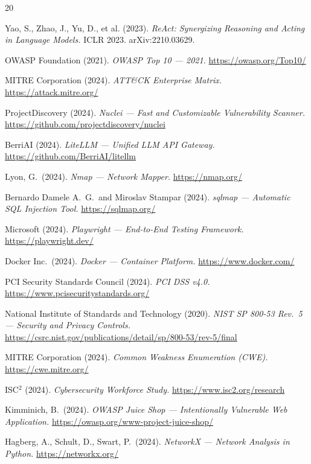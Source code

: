 \documentclass[12pt,a4paper,twoside]{report}
\begin{document}
\begin{thebibliography}{20}

Yao, S., Zhao, J., Yu, D., et al. (2023).
\textit{ReAct: Synergizing Reasoning and Acting in Language Models.}
ICLR 2023. arXiv:2210.03629.

OWASP Foundation (2021).
\textit{OWASP Top 10 --- 2021.}
\url{https://owasp.org/Top10/}

MITRE Corporation (2024).
\textit{ATT\&CK Enterprise Matrix.}
\url{https://attack.mitre.org/}

ProjectDiscovery (2024).
\textit{Nuclei --- Fast and Customizable Vulnerability Scanner.}
\url{https://github.com/projectdiscovery/nuclei}

BerriAI (2024).
\textit{LiteLLM --- Unified LLM API Gateway.}
\url{https://github.com/BerriAI/litellm}

Lyon, G.\ (2024).
\textit{Nmap --- Network Mapper.}
\url{https://nmap.org/}

Bernardo Damele A.\ G.\ and Miroslav Stampar (2024).
\textit{sqlmap --- Automatic SQL Injection Tool.}
\url{https://sqlmap.org/}

Microsoft (2024).
\textit{Playwright --- End-to-End Testing Framework.}
\url{https://playwright.dev/}

Docker Inc.\ (2024).
\textit{Docker --- Container Platform.}
\url{https://www.docker.com/}

PCI Security Standards Council (2024).
\textit{PCI DSS v4.0.}
\url{https://www.pcisecuritystandards.org/}

National Institute of Standards and Technology (2020).
\textit{NIST SP 800-53 Rev.\ 5 --- Security and Privacy Controls.}
\url{https://csrc.nist.gov/publications/detail/sp/800-53/rev-5/final}

MITRE Corporation (2024).
\textit{Common Weakness Enumeration (CWE).}
\url{https://cwe.mitre.org/}

ISC$^2$ (2024).
\textit{Cybersecurity Workforce Study.}
\url{https://www.isc2.org/research}

Kimminich, B.\ (2024).
\textit{OWASP Juice Shop --- Intentionally Vulnerable Web Application.}
\url{https://owasp.org/www-project-juice-shop/}

Hagberg, A., Schult, D., Swart, P.\ (2024).
\textit{NetworkX --- Network Analysis in Python.}
\url{https://networkx.org/}

\end{thebibliography}
\end{document}

